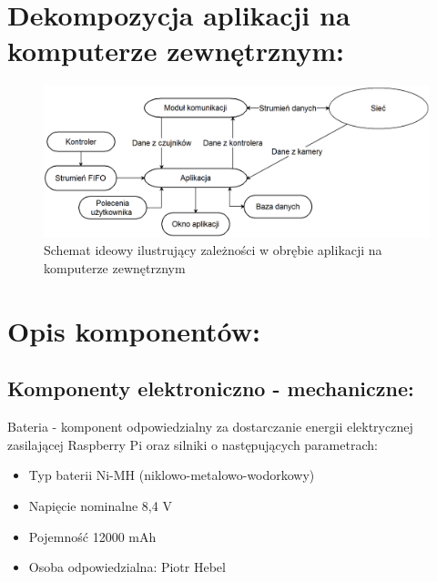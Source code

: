 \documentclass[a4paper]{article}
\begin{document}
\section{Dekompozycja aplikacji na komputerze zewnętrznym:}
\begin{figure}[H]
    \centering
    \includegraphics[width=15cm]{gui}
    \caption{Schemat ideowy ilustrujący zależności w obrębie aplikacji na komputerze zewnętrznym}
    \label{fig:my_label}
\end{figure}

\section{Opis komponentów:}

\subsection{Komponenty elektroniczno - mechaniczne:}


Bateria - komponent odpowiedzialny za dostarczanie energii elektrycznej zasilającej Raspberry Pi oraz silniki o następujących parametrach:
\begin{itemize}
\item Typ baterii Ni-MH (niklowo-metalowo-wodorkowy)
\item Napięcie nominalne 8,4 V
\item Pojemność 12000 mAh
\item Osoba odpowiedzialna: Piotr Hebel
\end{itemize}
\end{document}
